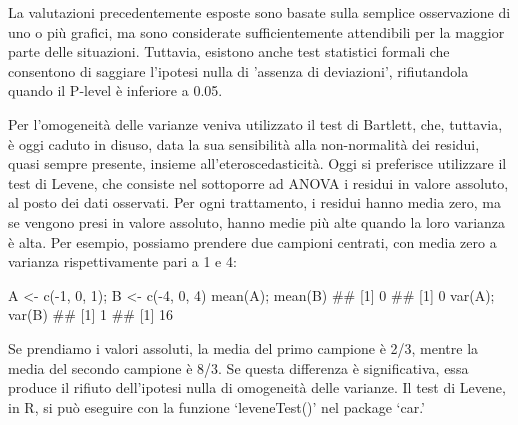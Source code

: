 \documentclass[a4paper,12pt,oneside]{book}
\newenvironment{Shaded}{\begin{snugshade}}{\end{snugshade}}
\newcommand{\DecValTok}[1]{#1}
\newcommand{\SpecialCharTok}[1]{#1}
\newcommand{\DocumentationTok}[1]{#1}
\newcommand{\OtherTok}[1]{#1}
\newcommand{\FunctionTok}[1]{#1}
\newcommand{\NormalTok}[1]{#1}
\begin{document}
La valutazioni precedentemente esposte sono basate sulla semplice osservazione di uno o più grafici, ma sono considerate sufficientemente attendibili per la maggior parte delle situazioni. Tuttavia, esistono anche test statistici formali che consentono di saggiare l'ipotesi nulla di 'assenza di deviazioni', rifiutandola quando il P-level è inferiore a 0.05.

Per l'omogeneità delle varianze veniva utilizzato il test di Bartlett, che, tuttavia, è oggi caduto in disuso, data la sua sensibilità alla non-normalità dei residui, quasi sempre presente, insieme all'eteroscedasticità. Oggi si preferisce utilizzare il test di Levene, che consiste nel sottoporre ad ANOVA i residui in valore assoluto, al posto dei dati osservati. Per ogni trattamento, i residui hanno media zero, ma se vengono presi in valore assoluto, hanno medie più alte quando la loro varianza è alta. Per esempio, possiamo prendere due campioni centrati, con media zero a varianza rispettivamente pari a 1 e 4:

\begin{Shaded}
\begin{Highlighting}[]
\NormalTok{A }\OtherTok{\textless{}{-}} \FunctionTok{c}\NormalTok{(}\SpecialCharTok{{-}}\DecValTok{1}\NormalTok{, }\DecValTok{0}\NormalTok{, }\DecValTok{1}\NormalTok{); B }\OtherTok{\textless{}{-}} \FunctionTok{c}\NormalTok{(}\SpecialCharTok{{-}}\DecValTok{4}\NormalTok{, }\DecValTok{0}\NormalTok{, }\DecValTok{4}\NormalTok{)}
\FunctionTok{mean}\NormalTok{(A); }\FunctionTok{mean}\NormalTok{(B)}
\DocumentationTok{\#\# [1] 0}
\DocumentationTok{\#\# [1] 0}
\FunctionTok{var}\NormalTok{(A); }\FunctionTok{var}\NormalTok{(B)}
\DocumentationTok{\#\# [1] 1}
\DocumentationTok{\#\# [1] 16}
\end{Highlighting}
\end{Shaded}

Se prendiamo i valori assoluti, la media del primo campione è 2/3, mentre la media del secondo campione è 8/3. Se questa differenza è significativa, essa produce il rifiuto dell'ipotesi nulla di omogeneità delle varianze. Il test di Levene, in R, si può eseguire con la funzione `leveneTest()' nel package `car.'
\end{document}
